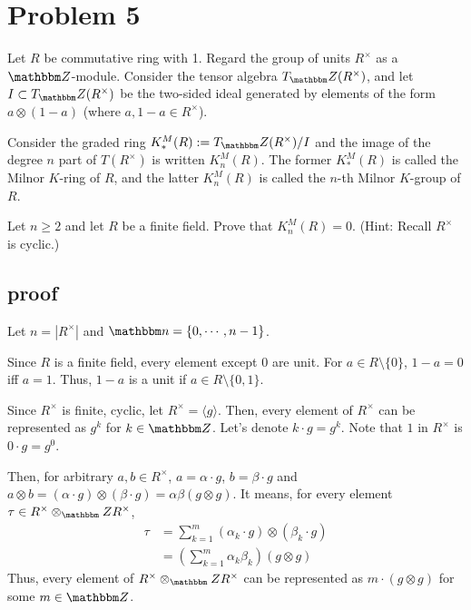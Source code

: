 \section*{Problem 5}

Let \(R\) be commutative ring with 1.
Regard the group of units \(R^\times\) as a \(\bbZ\)-module.
Consider the tensor algebra \(T_\bbZ(R^\times)\),
and let \(I \subset T_\bbZ(R^\times)\) be the two-sided ideal
generated by elements of the form
\(a \otimes (1 - a)\)
(where \(a, 1-a \in R^\times\)).

Consider the graded ring \(K_*^M(R) := T_\bbZ(R^\times) / I\)
and the image of the degree \(n\) part of \(T(R^\times)\)
is written \(K_n^M(R)\).
The former \(K_*^M(R)\) is called
the Milnor \(K\)-ring of \(R\),
and the latter \(K_n^M(R)\)
is called the \(n\)-th Milnor \(K\)-group of \(R\).

Let \(n \ge 2\)
and let \(R\) be a finite field.
Prove that \(K_n^M(R) = 0\).
(Hint: Recall \(R^\times\) is cyclic.)

\subsection*{proof}

Let \(n = |R^\times|\) and \(\bbn = \{0, \cdots, n - 1\}\).

Since \(R\) is a finite field, every element except 0 are unit.
For \(a \in R \setminus \{0\}\), \(1 - a = 0\) iff \(a = 1\).
Thus, \(1 - a \) is a unit if \(a \in R \setminus \{0, 1\}\).

Since \(R^\times\) is finite, cyclic, let \(R^\times = \langle g \rangle\).
Then, every element of \(R^\times\) can be represented as \(g^k\) for \(k \in \bbZ\).
Let's denote \(k \cdot g = g^k\).
Note that \(1\) in \(R^\times\) is \(0 \cdot g = g^0\).

Then, for arbitrary \(a, b \in R^\times\),
\(a = \alpha \cdot g\),
\(b = \beta \cdot g\)
and
\(a \otimes b = (\alpha \cdot g) \otimes (\beta \cdot g) = \alpha\beta (g \otimes g)\).
It means, for every element \(\tau \in R^\times \otimes_\bbZ R^\times\),
\begin{align*}
  \tau
  &= \sum_{k=1}^{m} (\alpha_k \cdot g) \otimes (\beta_k \cdot g)
  \\&= \left(\sum_{k=1}^m \alpha_k \beta_k\right) (g \otimes g)
\end{align*}
Thus, every element of \(R^\times \otimes_\bbZ R^\times\) can be represented as
\(m \cdot (g \otimes g)\) for some \(m \in \bbZ\).

